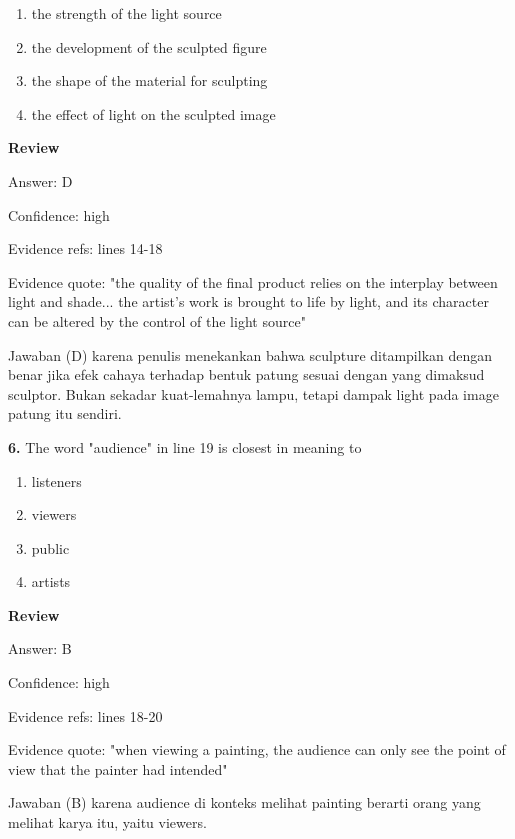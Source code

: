 \documentclass[12pt]{article}
\begin{document}
\begin{enumerate}[label=(\Alph*),leftmargin=*,itemsep=0.2em]
\item the strength of the light source
\item the development of the sculpted figure
\item the shape of the material for sculpting
\item the effect of light on the sculpted image
\end{enumerate}
\par
\begingroup
\setlength{\parskip}{0pt}
\setlength{\parindent}{0pt}
\textbf{Review}\par
Answer: D\par
Confidence: high\par
Evidence refs: lines 14-18\par
Evidence quote: "the quality of the final product relies on the interplay between light and shade... the artist's work is brought to life by light, and its character can be altered by the control of the light source"\par
Jawaban (D) karena penulis menekankan bahwa sculpture ditampilkan dengan benar jika efek cahaya terhadap bentuk patung sesuai dengan yang dimaksud sculptor. Bukan sekadar kuat-lemahnya lampu, tetapi dampak light pada image patung itu sendiri.\par
\endgroup
\par
\vspace{0.25\baselineskip}
\noindent\textbf{6.} The word "audience" in line 19 is closest in meaning to
\begin{enumerate}[label=(\Alph*),leftmargin=*,itemsep=0.2em]
\item listeners
\item viewers
\item public
\item artists
\end{enumerate}
\par
\begingroup
\setlength{\parskip}{0pt}
\setlength{\parindent}{0pt}
\textbf{Review}\par
Answer: B\par
Confidence: high\par
Evidence refs: lines 18-20\par
Evidence quote: "when viewing a painting, the audience can only see the point of view that the painter had intended"\par
Jawaban (B) karena audience di konteks melihat painting berarti orang yang melihat karya itu, yaitu viewers.\par
\end{document}
